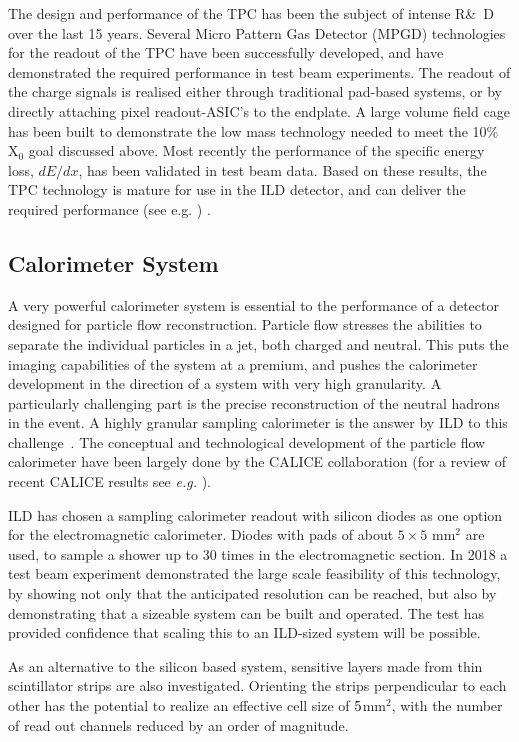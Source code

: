 \documentclass[%
 amsmath,amssymb,
 aps,
 longbibliography,
]{revtex4-1}
\begin{document}
The design and performance of the TPC has been the subject of intense {R\&~D} over the last 15 years. Several Micro Pattern Gas Detector (MPGD) technologies for the readout of the TPC have been successfully developed, and have demonstrated the required performance in test beam experiments. The readout of the charge signals is realised either through traditional pad-based systems, or by directly attaching pixel readout-ASIC's to the endplate. A large volume field cage has been built to demonstrate the low mass technology needed to meet the 10\% X$_0$ goal discussed above. Most recently the performance of the specific energy loss, $dE/dx$, has been validated in test beam data. Based on these results, the TPC technology is mature for use in the ILD detector, and can deliver the required performance (see e.g. \cite{Attie:2016yeu, Bouchez:2007pe}) . 


\subsection{Calorimeter System}
A very powerful calorimeter system is essential to the performance of a detector designed for particle flow reconstruction. Particle flow stresses the abilities to separate the individual particles in a jet, both charged and neutral. This puts the imaging capabilities of the system at a premium, and pushes the calorimeter development in the direction of a system with very high granularity. A particularly challenging part is the precise reconstruction of the neutral hadrons in the event. A highly granular sampling calorimeter is the answer by ILD to this challenge~\cite{Sefkow:2015hna}. The conceptual and technological development of the particle flow calorimeter have been largely done by the CALICE collaboration (for a review of recent CALICE results see {\it e.g.} \cite{Grenier:2017ewg}). 

ILD has chosen a sampling calorimeter readout with silicon diodes as one option for the electromagnetic calorimeter. Diodes with pads of about $5 \times 5$ mm$^2$ are used, to sample a shower up to 30 times in the electromagnetic section. In 2018 a test beam experiment demonstrated the large scale feasibility of this technology, by showing not only that the anticipated resolution can be reached, but also by demonstrating that a sizeable system can be built and operated. The test has provided confidence that scaling this to an ILD-sized system will be possible.

As an alternative to the silicon based system, sensitive layers made from thin scintillator strips are also investigated. Orienting the strips perpendicular to each other has the potential to realize an effective cell size of $5\time 5$mm$^2$, with the number of read out channels reduced by an order of magnitude. 
\end{document}
